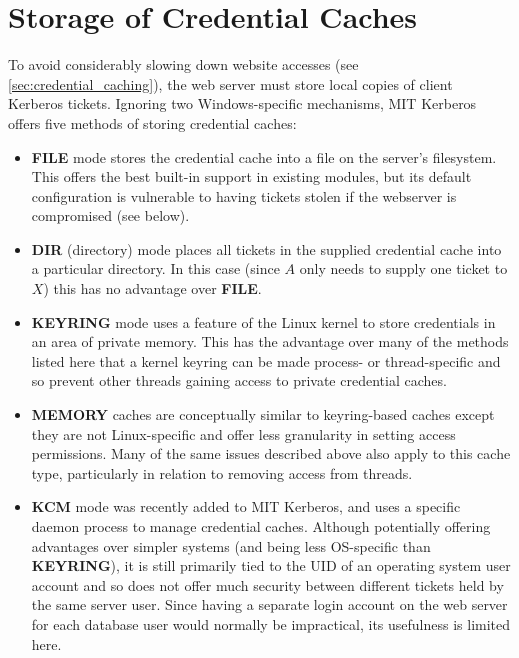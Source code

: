\documentclass[12pt]{report}
\begin{document}
\section{Storage of Credential Caches}
\label{sec:storage_of_credential_caches}
To avoid considerably slowing down website accesses (see \autoref{sec:credential_caching}), the web server must store local copies of client Kerberos tickets. Ignoring two Windows-specific mechanisms, MIT Kerberos offers five methods of storing credential caches\cite{MIT-ccache-types}:

\begin{itemize}
\item
  \textbf{FILE} mode stores the credential cache into a file on the server's filesystem. This offers the best built-in support in existing modules, but its default configuration is vulnerable to having tickets stolen if the webserver is compromised (see below).
\item
  \textbf{DIR} (directory) mode places all tickets in the supplied credential cache into a particular directory. In this case (since $A$ only needs to supply one ticket to $X$) this has no advantage over \textbf{FILE}.
\item
  \textbf{KEYRING} mode uses a feature of the Linux kernel to store credentials in an area of private memory. This has the advantage over many of the methods listed here that a kernel keyring can be made process- or thread-specific and so prevent other threads gaining access to private credential caches.

\item
  \textbf{MEMORY} caches are conceptually similar to keyring-based caches except they are not Linux-specific and offer less granularity in setting access permissions. Many of the same issues described above also apply to this cache type, particularly in relation to removing access from threads.
\item
  \textbf{KCM} mode was recently added to MIT Kerberos, and uses a specific daemon process to manage credential caches. Although potentially offering advantages over simpler systems (and being less OS-specific than \textbf{KEYRING}), it is still primarily tied to the UID of an operating system user account and so does not offer much security between different tickets held by the same server user. Since having a separate login account on the web server for each database user would normally be impractical, its usefulness is limited here.
\end{itemize}
\end{document}
